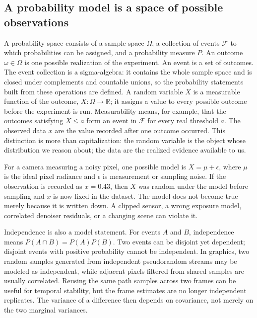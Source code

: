 \subsection{A probability model is a space of possible observations}\label{03-visual-computing-i-ch012-a-probability-model-is-a-space-of-possible-observations}

A probability space consists of a sample space \(\Omega\), a collection of events \(\mathcal F\) to which probabilities can be assigned, and a probability measure \(P\). An outcome \(\omega\in\Omega\) is one possible realization of the experiment. An event is a set of outcomes. The event collection is a sigma-algebra: it contains the whole sample space and is closed under complements and countable unions, so the probability statements built from these operations are defined. A random variable \(X\) is a measurable function of the outcome, \(X:\Omega\to\mathbb R\); it assigns a value to every possible outcome before the experiment is run. Measurability means, for example, that the outcomes satisfying \(X\le a\) form an event in \(\mathcal F\) for every real threshold \(a\). The observed data \(x\) are the value recorded after one outcome occurred. This distinction is more than capitalization: the random variable is the object whose distribution we reason about; the data are the realized evidence available to us.

For a camera measuring a noisy pixel, one possible model is \(X=\mu+\epsilon\), where \(\mu\) is the ideal pixel radiance and \(\epsilon\) is measurement or sampling noise. If the observation is recorded as \(x=0.43\), then \(X\) was random under the model before sampling and \(x\) is now fixed in the dataset. The model does not become true merely because it is written down. A clipped sensor, a wrong exposure model, correlated denoiser residuals, or a changing scene can violate it.

Independence is also a model statement. For events \(A\) and \(B\), independence means \(P(A\cap B)=P(A)P(B)\). Two events can be disjoint yet dependent; disjoint events with positive probability cannot be independent. In graphics, two random samples generated from independent pseudorandom streams may be modeled as independent, while adjacent pixels filtered from shared samples are usually correlated. Reusing the same path samples across two frames can be useful for temporal stability, but the frame estimates are no longer independent replicates. The variance of a difference then depends on covariance, not merely on the two marginal variances.

